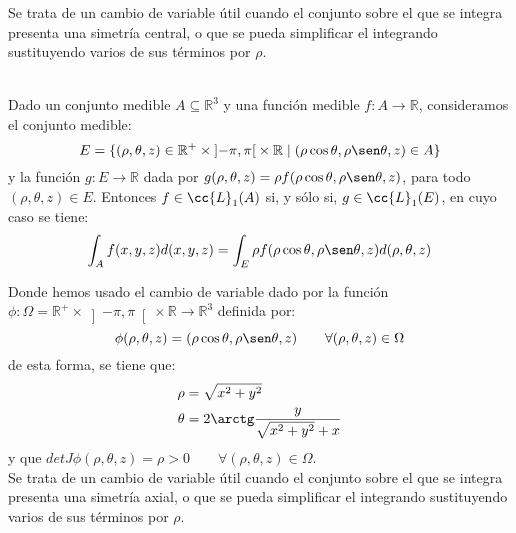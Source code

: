 Se trata de un cambio de variable útil cuando el conjunto sobre el que se integra presenta una simetría central, o que se pueda simplificar el integrando sustituyendo varios de sus términos por $\rho$.

\begin{teo}\ \\
    Dado un conjunto medible $A\subseteq \mathbb{R}^3$ y una función medible $f:A\to \mathbb{R}$, consideramos el conjunto medible:
    \begin{equation*}
        E = \{(\rho, \theta,z)\in \mathbb{R}^+ \times \left]-\pi,\pi\right[\times\mathbb{R} \mid (\rho\cos\theta, \rho\sen\theta,z)\in A\}
    \end{equation*}
    y la función $g:E\to \mathbb{R}$ dada por $g(\rho, \theta,z)=\rho f(\rho\cos\theta, \rho\sen\theta,z)$, para todo $(\rho, \theta,z)\in E$. Entonces $f\in \cc{L}_1(A)$ si, y sólo si, $g\in \cc{L}_1(E)$, en cuyo caso se tiene:
    \begin{equation*}
        \int_A f(x,y,z)d(x,y,z) = \int_E \rho f(\rho\cos\theta, \rho\sen\theta,z)d(\rho,\theta,z)
    \end{equation*}
\end{teo}

Donde hemos usado el cambio de variable dado por la función\newline ${\phi:\Omega=\mathbb{R}^+ \times \left]-\pi,\pi\right[\times\mathbb{R} \to \mathbb{R}^3}$ definida por:
\begin{equation*}
    \phi(\rho,\theta,z) = (\rho\cos\theta, \rho\sen\theta,z)\qquad \forall (\rho,\theta,z)\in \Omega
\end{equation*}
de esta forma, se tiene que:
\begin{align*}
    \rho &= \sqrt{x^2+y^2} \\
    \theta &= 2\arctg \dfrac{y}{\sqrt{x^2+y^2}+x}
\end{align*}
y que $detJ\phi(\rho,\theta,z)=\rho >0\qquad \forall (\rho, \theta,z)\in \Omega$.\\

Se trata de un cambio de variable útil cuando el conjunto sobre el que se integra presenta una simetría axial, o que se pueda simplificar el integrando sustituyendo varios de sus términos por $\rho$.

